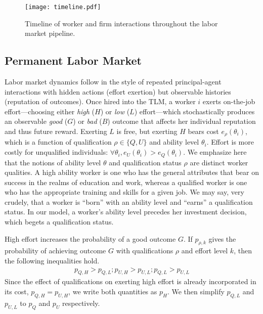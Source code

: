 \documentclass[sigconf]{acmart}
\theoremstyle{definition}
\begin{document}
 
\begin{figure}
\centering
\texttt{[image: timeline.pdf]}
\caption{Timeline of worker and firm interactions throughout the labor market pipeline.}
\label{fig:timeline}
\end{figure}

\subsection{Permanent Labor Market}
Labor market dynamics follow in the style of repeated principal-agent interactions with hidden actions (effort exertion) but observable histories (reputation of outcomes). Once hired into the TLM, a worker $i$ exerts on-the-job effort---choosing either \emph{high} ($H$) or \emph{low} ($L$) effort---which stochastically produces an observable \emph{good} ($G$) or \emph{bad} ($B$) outcome that affects her individual reputation and thus future reward. Exerting $L$ is free, but exerting $H$ bears cost $e_\rho(\theta_i)$, which is a function of qualification $\rho \in \{Q,U\}$ and ability level $\theta_i$. Effort is more costly for unqualified individuals: $\forall \theta_i, e_U(\theta_i) > e_Q(\theta_i)$. We emphasize here that the notions of ability level $\theta$ and qualification status $\rho$ are distinct worker qualities. A high ability worker is one who has the general attributes that bear on success in the realms of education and work, whereas a qualified worker is one who has the appropriate training and skills for a given job. We may say, very crudely, that a worker is ``born'' with an ability level and ``earns'' a qualification status. In our model, a worker's ability level precedes her investment decision, which begets a qualification status.

High effort increases the probability of a good outcome $G$. If $p_{\rho, k}$ gives the probability of achieving outcome $G$ with qualifications $\rho$ and effort level $k$, then the following inequalities hold.
\begin{align*}
p_{Q,H} > p_{Q,L}; p_{U,H} > p_{U,L}; p_{Q,L} > p_{U,L}
\end{align*}
Since the effect of qualifications on exerting high effort is already incorporated in its cost, $p_{Q,H}=p_{U,H}$, we write both quantities as $p_H$. We then simplify $p_{Q,L}$ and $p_{U,L}$ to $p_Q$ and $p_U$ respectively.  
\end{document}

